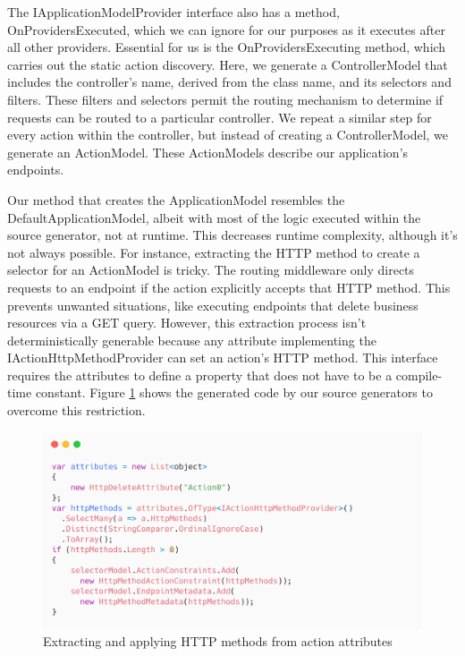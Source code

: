 The IApplicationModelProvider interface also has a method, OnProvidersExecuted, which we can ignore for our purposes as it executes after all other providers. Essential for us is the OnProvidersExecuting method, which carries out the static action discovery. Here, we generate a ControllerModel that includes the controller's name, derived from the class name, and its selectors and filters. These filters and selectors permit the routing mechanism to determine if requests can be routed to a particular controller. We repeat a similar step for every action within the controller, but instead of creating a ControllerModel, we generate an ActionModel. These ActionModels describe our application's endpoints.

Our method that creates the ApplicationModel resembles the DefaultApplicationModel, albeit with most of the logic executed within the source generator, not at runtime. This decreases runtime complexity, although it's not always possible. For instance, extracting the HTTP method to create a selector for an ActionModel is tricky. The routing middleware only directs requests to an endpoint if the action explicitly accepts that HTTP method. This prevents unwanted situations, like executing endpoints that delete business resources via a GET query. However, this extraction process isn't deterministically generable because any attribute implementing the IActionHttpMethodProvider can set an action's HTTP method. This interface requires the attributes to define a property that does not have to be a compile-time constant.  Figure \ref{fig:action-provider} shows the generated code by our source generators to overcome this restriction.

\begin{figure}[H]
\centering
\includegraphics[width=1\textwidth]{graphics/action_http_method_provider.png}
\caption{Extracting and applying HTTP methods from action attributes}
\label{fig:action-provider}
\end{figure}

